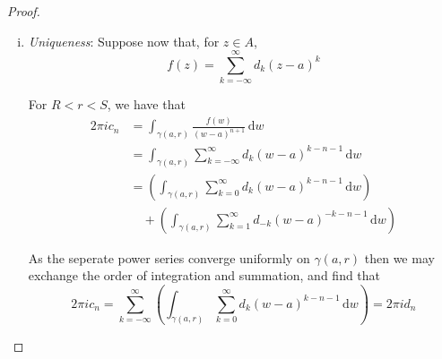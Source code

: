 \documentclass[10pt,fleqn]{article}
\newcommand{\diff}{\,\mathrm{d}}
\theoremstyle{definition} \newtheorem{defn}{Definition}[section]
\theoremstyle{plain}      \newtheorem{thm}[defn]{Theorem}
\theoremstyle{definition} \newtheorem{prop}[defn]{Proposition}
\theoremstyle{plain}      \newtheorem{lem}[defn]{Lemma}
\theoremstyle{definition} \newtheorem{cor}[defn]{Corollary}
\theoremstyle{definition} \newtheorem{ex}[defn]{Example}
\theoremstyle{definition} \newtheorem{rem}[defn]{Remark}
\begin{document}
\begin{proof}
\begin{enumerate}[(i)]
        Arguing as in the proof for Taylor's Theorem, with the Weierstrass M-Test, we may show that these sums converge uniformly.
        Hence we may change the order of integration and summation to obtain
        \begin{align*}
            f(z)
            &=
            \sum_{k=0}^{\infty}\left(\frac{1}{2\pi i}\int_{\gamma(a,Q)}\frac{f(w)}{(w-a)^{k+1}}\diff w\right)(z-a)^k\\
            &\quad+
            \sum_{k=0}^{\infty}\left(\frac{1}{2\pi i}\int_{\gamma(a,P)}f(w)(w-a)^k\diff w\right)(z-a)^{-k-1}\\
            &=
            \sum_{k=0}^{\infty}\left(\frac{1}{2\pi i}\int_{\gamma(a,r)}\frac{f(w)}{(w-a)^{k+1}}\diff w\right)(z-a)^k\\
            &\quad+
            \sum_{k=0}^{\infty}\left(\frac{1}{2\pi i}\int_{\gamma(a,r)}f(w)(w-a)^k\diff w\right)(z-a)^{-k-1}\\
            &=
            \sum_{k=-\infty}^{\infty}\left(\frac{1}{2\pi i}\int_{\gamma(a,r)}\frac{f(w)}{(w-a)^{k+1}}\diff w\right)(z-a)^k
        \end{align*}
        as required.
        \item \emph{Uniqueness}:
        Suppose now that, for $z\in A$,
        \[
            f(z)=
            \sum_{k=-\infty}^{\infty}d_k(z-a)^k
        \]

        For $R<r<S$, we have that
        \begin{align*}
            2\pi ic_n
            &=
            \int_{\gamma(a,r)}\frac{f(w)}{(w-a)^{n+1}}\diff w\\
            &=
            \int_{\gamma(a,r)}\sum_{k=-\infty}^{\infty}d_k(w-a)^{k-n-1}\diff w\\
            &=
            \left(\int_{\gamma(a,r)}\sum_{k=0}^{\infty}d_k(w-a)^{k-n-1}\diff w\right)\\
            &\quad+
            \left(\int_{\gamma(a,r)}\sum_{k=1}^{\infty}d_{-k}(w-a)^{-k-n-1}\diff w\right)
        \end{align*}

        As the seperate power series converge uniformly on $\gamma(a,r)$ then we may exchange the order of integration and summation, and find that
        \[
            2\pi ic_n=
            \sum_{k=-\infty}^{\infty}\left(\int_{\gamma(a,r)}\sum_{k=0}^{\infty}d_k(w-a)^{k-n-1}\diff w\right)=
            2\pi id_n
        \]
    \end{enumerate}
\end{proof}
\end{document}
